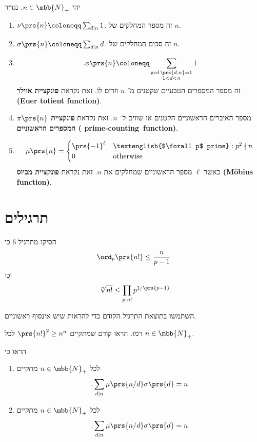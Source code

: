 \documentclass[a4paper,10pt,twoside,openany]{book}
\begin{document}
\begin{definition}
יהי
$n \in \mbb{N}_+$.
נגדיר
\begin{enumerate}
\item $\nu\prs{n} \coloneqq \sum_{d \mid n} 1$. זה מספר המחלקים של $n$.
\item $\sigma\prs{n} \coloneqq \sum_{d \mid n} d$. זה סכום המחלקים של $n$.
\item \[\text{.}\phi\prs{n} \coloneqq \sum_{\substack{\gcd\prs{d,n} = 1 \\ 1 < d < n}} 1\] זה מספר המספרים הטבעיים שקטנים מ־%
$n$
וזרים לו.
זאת נקראת
\textbf{פונקציית אוילר (\textenglish{Euer totient function})}.
\item $\pi\prs{n}$ מספר האיברים הראשוניים הקטנים או שווים ל־%
$n$.
זאת נקראת
\textbf{פונקציית המספרים הראשוניים (
\textenglish{prime-counting~function})}.
\item \[\mu\prs{n} = \begin{cases}
\prs{-1}^\ell & \text{\textenglish{$\forall p$ prime}}: p^2 \nmid n \\
0 & \text{otherwise}
\end{cases}\]
כאשר
$\ell$
מספר הראשוניים שמחלקים את
$n$.
זאת נקראת
\textbf{פונקציית מביוס (\textenglish{Möbius function})}.
\end{enumerate}
\end{definition}

\section{תרגילים}

\begin{exercisechap}
הסיקו מתרגיל 6 כי
\[\ord_p\prs{n!} \leq \frac{n}{p-1}\]
וכי
\[\text{.} \sqrt[n]{n!} \leq \prod_{p \mid n!} p^{1 / \prs{p-1}}\]
\end{exercisechap}

\begin{exercisechap}
השתמשו בתוצאת התרגיל הקודם כדי להראות שיש אינסוף ראשוניים.

\emph{רמז:}
הראו קודם שמתקיים
$\prs{n!}^2 \geq n^n$
לכל
$n \in \mbb{N}_+$.
\end{exercisechap}

\begin{exercisechap}
הראו כי
\begin{enumerate}[label = (\alph*)]
\item לכל
$n \in \mbb{N}_+$
מתקיים
\[\text{.} \sum_{d \mid n} \mu\prs{n/d} \sigma\prs{d} = n\]
\item לכל
$n \in \mbb{N}_+$
מתקיים
\[\text{.} \sum_{d \mid n} \mu\prs{n/d} \sigma\prs{d} = n\]
\end{enumerate}
\end{exercisechap}
\end{document}
